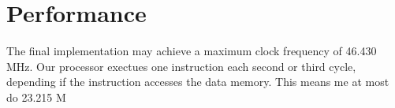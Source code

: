 \section{Performance}
The final implementation may achieve a maximum clock frequency of 46.430 MHz.
Our processor exectues one instruction each second or third cycle, depending if the instruction accesses the data memory.
This means me at most do 23.215 M
